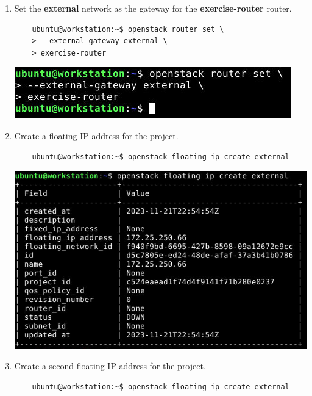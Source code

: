 \documentclass[letterpaper, 12pt]{article}
\begin{document}
\begin{enumerate}
    \item Set the \textbf{external} network as the gateway for the \textbf{exercise-router} router.
    \begin{lstlisting}
    ubuntu@workstation:~$ openstack router set \
    > --external-gateway external \
    > exercise-router
    \end{lstlisting}

    \begin{center}
        \includegraphics[width=\linewidth]{images/part5/step4.png}
    \end{center}

    \item Create a floating IP address for the project.
    \begin{lstlisting}
    ubuntu@workstation:~$ openstack floating ip create external
    \end{lstlisting}

    \begin{center}
        \includegraphics[width=\linewidth]{images/part5/step5.png}
    \end{center}

    \item Create a second floating IP address for the project.
    \begin{lstlisting}
    ubuntu@workstation:~$ openstack floating ip create external
    \end{lstlisting}


\end{enumerate}
\end{document}
